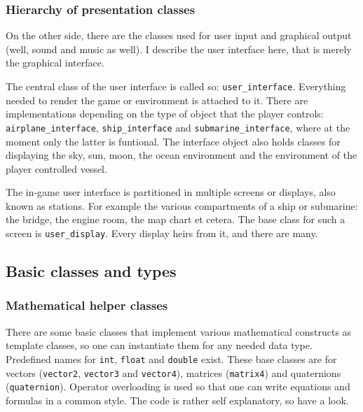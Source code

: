 \documentclass{report}
\begin{document}
\subsubsection{Hierarchy of presentation classes}

On the other side, there are the classes used for user input and
graphical output (well, sound and music as well). I describe the user
interface here, that is merely the graphical interface.

The central class of the user interface is called so:
\texttt{user\_interface}. Everything needed to render the game or
environment is attached to it. There are implementations depending on
the type of object that the player controls:
\texttt{airplane\_interface}, \texttt{ship\_interface} and
\texttt{submarine\_interface}, where at the moment only the latter is
funtional. The interface object also holds classes for displaying the
sky, sun, moon, the ocean environment and the environment of the player
controlled vessel.

The in-game user interface is partitioned in multiple screens or
displays, also known as stations. For example the various compartments
of a ship or submarine: the bridge, the engine room, the map chart et
cetera. The base class for such a screen is \texttt{user\_display}.
Every display heirs from it, and there are many.



\subsection{Basic classes and types}

\subsubsection{Mathematical helper classes}

There are some basic classes that implement various mathematical
constructs as template classes, so one can instantiate them for any
needed data type. Predefined names for \texttt{int}, \texttt{float} and
\texttt{double} exist. These base classes are for vectors
(\texttt{vector2}, \texttt{vector3} and \texttt{vector4}), matrices
(\texttt{matrix4}) and quaternions (\texttt{quaternion}). Operator
overloading is used so that one can write equations and formulas in a
common style. The code is rather self explanatory, so have a look.
\end{document}
